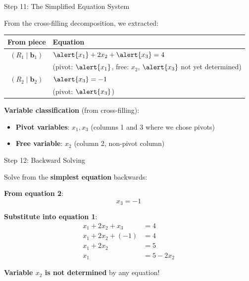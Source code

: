 \documentclass[10pt]{beamer}
\theoremstyle{definition}
\newcommand{\x}[1]{\alert{\textbf{#1}}}
\begin{document}
\begin{frame}{Step 11: The Simplified Equation System}

From the cross-filling decomposition, we extracted:

\vspace{1em}

\begin{center}
\begin{tabular}{c|l}
\textbf{From piece} & \textbf{Equation} \\
\hline
$(R_1 \mid \mathbf{b}_1)$ & $\alert{x_1} + 2x_2 + \alert{x_3} = 4$ \\
& (pivot: $\alert{x_1}$, free: $x_2$, $\alert{x_3}$ not yet determined) \\
\hline
$(R_2 \mid \mathbf{b}_2)$ & $\alert{x_3} = -1$ \\
& (pivot: $\alert{x_3}$) \\
\end{tabular}
\end{center}

\vspace{1em}

\x{Variable classification} (from cross-filling):
\begin{itemize}
\item \x{Pivot variables}: $x_1, x_3$ (columns 1 and 3 where we chose pivots)
\item \x{Free variable}: $x_2$ (column 2, non-pivot column)
\end{itemize}

\end{frame}

\begin{frame}{Step 12: Backward Solving}

Solve from the \x{simplest equation} backwards:

\vspace{1em}

\x{From equation 2}:
$$x_3 = -1$$

\vspace{1em}

\x{Substitute into equation 1}:
\begin{align*}
x_1 + 2x_2 + x_3 &= 4 \\
x_1 + 2x_2 + (-1) &= 4 \\
x_1 + 2x_2 &= 5 \\
x_1 &= 5 - 2x_2
\end{align*}

\vspace{1em}

\x{Variable $x_2$ is not determined} by any equation!

\end{frame}
\end{document}
